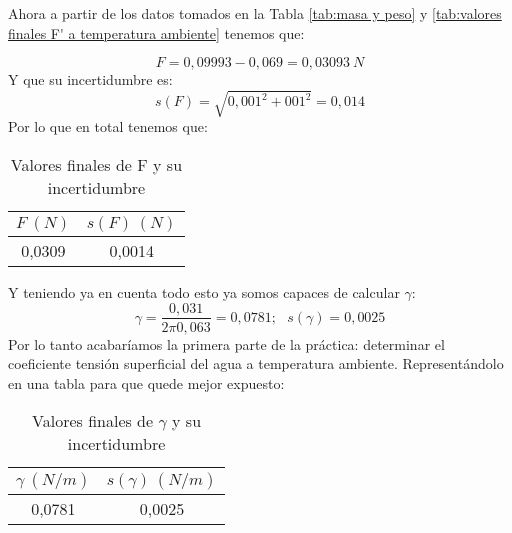 \documentclass[10pt,a4paper]{article}
\begin{document}
\begin{flushleft}
Ahora a partir de los datos tomados en la Tabla \ref{tab:masa y peso} y \ref{tab:valores finales F' a temperatura ambiente} tenemos que: 
\end{flushleft}

$$ F = 0,09993 - 0,069 = 0,03093 \ N$$
Y que su incertidumbre es:
$$ s(F)=\sqrt{0,001^2+001^2}=0,014$$
Por lo que en total tenemos que:

\begin{table}[h!] %
\begin{center}
\begin{tabular}{|c|c|}
\hline
$F \ (N)$ &  $s(F) \ (N)$ \\ \hline
0,0309 & 0,0014 \\ \hline
\end{tabular}
\caption{Valores finales de F y su incertidumbre}
\label{tab:valores finales F a temperatura ambiente}
\end{center}
\end{table} 

Y teniendo ya en cuenta todo esto ya somos capaces de calcular $\gamma$: 
$$ \gamma = \dfrac{0,031}{2 \pi 0,063} = 0,0781; \ \ \ s(\gamma)=0,0025$$
Por lo tanto acabaríamos la primera parte de la práctica: determinar el coeficiente tensión superficial del agua a temperatura ambiente. Representándolo en una tabla para que quede mejor expuesto:

\begin{table}[h!] %
\begin{center}
\begin{tabular}{|c|c|}
\hline
$\gamma  \ (N/m)$ &  $s(\gamma) \ (N/m)$ \\ \hline
0,0781 & 0,0025 \\ \hline
\end{tabular}
\caption{Valores finales de $\gamma$ y su incertidumbre}

\label{tab:valores finales F a temperatura ambiente}
\end{center}
\end{table} 
\end{document}

